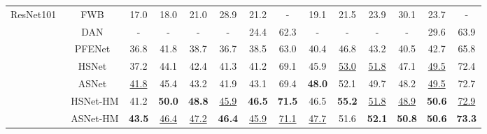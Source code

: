 \documentclass[runningheads]{llncs}
\begin{document}
\begin{table}
{\begin{tabular}{@{}cc|cccccc|cccccc@{}}
\multirow{7}{*}{ResNet101~\cite{Resnet}} & FWB~\cite{FWB} & 17.0 & 18.0 & 21.0 & 28.9 & 21.2 & - & 19.1 & 21.5 & 23.9 & 30.1 & 23.7 & - \\
 & DAN~\cite{DAN} & - & - & - & - & 24.4 & 62.3 & - & - & - & - & 29.6 & 63.9  \\
 & PFENet~\cite{PFENet} & {36.8} & 41.8 & {38.7} & 36.7 & 38.5 & 63.0 & 40.4 & 46.8 & 43.2 & 40.5 & 42.7 & 65.8 \\
 & HSNet~\cite{HSNet} & 37.2 & {44.1} & {42.4} & {41.3} & {41.2} & {69.1} & {45.9} & \underline{53.0} & \underline{51.8} & {47.1} & \underline{49.5} & {72.4} \\
& ASNet~\cite{ASNet} & \underline{41.8} & 45.4 & 43.2 & {41.9} & {43.1}  & {69.4} & \textbf{48.0} & 52.1 & 49.7 & 48.2 & \underline{49.5} & 72.7 \\
\cmidrule(l){2-14} 
 & HSNet-HM & {41.2} & \textbf{50.0} & \textbf{48.8} & \underline{45.9} & \textbf{46.5} & \textbf{71.5}  & {46.5}  & \textbf{55.2} & \underline{51.8}  & \underline{48.9}  & \textbf{50.6} & \underline{72.9} \\
   & ASNet-HM & \textbf{43.5} & \underline{46.4} & \underline{47.2} & \textbf{46.4} & \underline{45.9} & \underline{71.1}  & \underline{47.7}  & {51.6} & \textbf{52.1}  & \textbf{50.8}  & \textbf{50.6} & \textbf{73.3} \\
  \bottomrule
\end{tabular}
}

\end{table}
\end{document}
